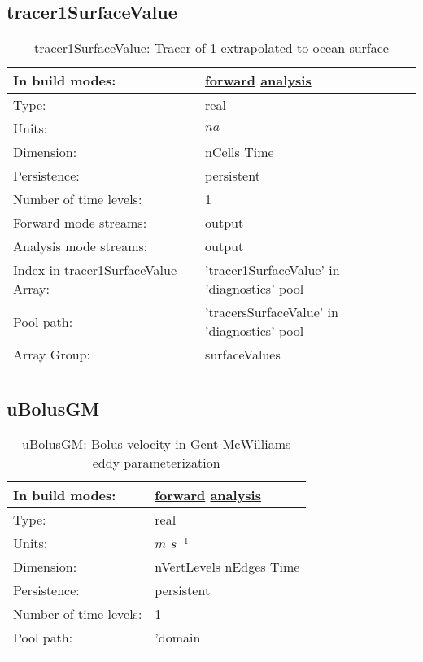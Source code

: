 \subsection[tracer1SurfaceValue]{tracer1SurfaceValue}
\label{subsec:var_sec_diagnostics_tracer1SurfaceValue}
\begin{center}
\begin{longtable}{| p{2.0in} | p{4.0in} |}
        \hline 
        In build modes: & \hyperref[subsec:forward_var_tab_diagnostics]{forward} \hyperref[subsec:analysis_var_tab_diagnostics]{analysis} \\
        \hline 
        Type: & real \\
        \hline 
        Units: & $na$ \\
        \hline 
        Dimension: & nCells Time \\
        \hline 
        Persistence: & persistent \\
        \hline 
        Number of time levels: & 1 \\
        \hline 
		 Forward mode streams: &  output \\
        \hline 
		 Analysis mode streams: &  output \\
        \hline 
		 Index in tracer1SurfaceValue Array: & 'tracer1SurfaceValue' in 'diagnostics' pool \\
		 \hline 
            Pool path: & 'tracersSurfaceValue' in 'diagnostics' pool
 \\
		 \hline 
		 Array Group: & surfaceValues \\
		 \hline 
    \caption{tracer1SurfaceValue: Tracer of 1 extrapolated to ocean surface}
\end{longtable}
\end{center}
\subsection[uBolusGM]{uBolusGM}
\label{subsec:var_sec_diagnostics_uBolusGM}
\begin{center}
\begin{longtable}{| p{2.0in} | p{4.0in} |}
        \hline 
        In build modes: & \hyperref[subsec:forward_var_tab_diagnostics]{forward} \hyperref[subsec:analysis_var_tab_diagnostics]{analysis} \\
        \hline 
        Type: & real \\
        \hline 
        Units: & $m$ $s^{-1}$ \\
        \hline 
        Dimension: & nVertLevels nEdges Time \\
        \hline 
        Persistence: & persistent \\
        \hline 
        Number of time levels: & 1 \\
        \hline 
            Pool path: & 'domain %
 \\
		 \hline 
    \caption{uBolusGM: Bolus velocity in Gent-McWilliams eddy parameterization}
\end{longtable}
\end{center}
